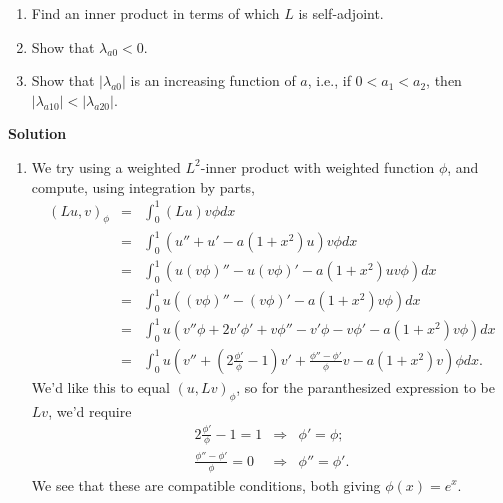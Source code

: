 \documentclass{article}
\begin{document}
\begin{enumerate}
\begin{enumerate}
\item Find an inner product in terms of which \(L\) is self-adjoint.

\item Show that \(\lambda_{a0} < 0\).

\item Show that \(|\lambda_{a0}|\) is an increasing function of \(a\), i.e., if \(0 < a_1 < a_2\), then \(|\lambda_{a10}| < |\lambda_{a20}|\).

\end{enumerate}

{\bf Solution}

\begin{enumerate}
\item We try using a weighted \(L^2\)-inner product with weighted function \(\phi\), and compute, using integration by parts,
\begin{eqnarray*}
(L u, v)_{\phi}
& = & \int_0^1 (L u) v \phi dx \\
& = & \int_0^1 \left( u'' + u' - a (1 + x^2) u \right) v \phi dx \\
& = & \int_0^1 \left( u (v \phi)'' - u (v \phi)' - a (1 + x^2) u v \phi \right) dx \\
& = & \int_0^1 u \left( (v \phi)'' - (v \phi)' - a (1 + x^2) v \phi \right) dx \\
& = & \int_0^1 u \left( v'' \phi + 2 v' \phi' + v \phi'' - v' \phi - v \phi' - a (1 + x^2) v \phi \right) dx \\
& = & \int_0^1 u \left( v'' + \left( 2 \frac{\phi'}{\phi} - 1 \right) v' + \frac{\phi'' - \phi'}{\phi} v - a (1 + x^2) v \right) \phi dx.
\end{eqnarray*}
We'd like this to equal \((u, L v)_{\phi}\), so for the paranthesized expression to be \(L v\), we'd require
\begin{eqnarray*}
2 \frac{\phi'}{\phi} - 1 = 1 & \Rightarrow & \phi' = \phi; \\
\frac{\phi'' - \phi'}{\phi} = 0 & \Rightarrow & \phi'' = \phi'.
\end{eqnarray*}
We see that these are compatible conditions, both giving \(\phi(x) = e^x\).


\end{enumerate}
\end{enumerate}
\end{document}
